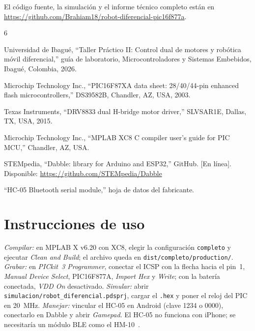 \documentclass[conference,letterpaper]{IEEEtran}
\begin{document}
El código fuente, la simulación y el informe técnico completo están en
\url{https://github.com/Brahiam18/robot-diferencial-pic16f877a}.

\begin{thebibliography}{6}

Universidad de Ibagué, ``Taller Práctico II: Control dual de motores y
robótica móvil diferencial,'' guía de laboratorio, Microcontroladores y
Sistemas Embebidos, Ibagué, Colombia, 2026.

Microchip Technology Inc., ``PIC16F87XA data sheet: 28/40/44-pin enhanced
flash microcontrollers,'' DS39582B, Chandler, AZ, USA, 2003.

Texas Instruments, ``DRV8833 dual H-bridge motor driver,'' SLVSAR1E, Dallas,
TX, USA, 2015.

Microchip Technology Inc., ``MPLAB XC8 C compiler user's guide for PIC MCU,''
Chandler, AZ, USA.

STEMpedia, ``Dabble: library for Arduino and ESP32,'' GitHub. [En línea].
Disponible: \url{https://github.com/STEMpedia/Dabble}

``HC-05 Bluetooth serial module,'' hoja de datos del fabricante.

\end{thebibliography}

\appendices
\section{Instrucciones de uso}

\textit{Compilar:} en MPLAB X v6.20 con XC8, elegir la configuración
\texttt{completo} y ejecutar \emph{Clean and Build}; el archivo queda en
\texttt{dist/completo/production/}.
\textit{Grabar:} en \emph{PICkit~3 Programmer}, conectar el ICSP con la flecha
hacia el pin~1, \emph{Manual Device Select}, PIC16F877A, \emph{Import Hex} y
\emph{Write}; con la batería conectada, \emph{VDD On} desactivado.
\textit{Simular:} abrir \texttt{simulacion/robot\_diferencial.pdsprj},
cargar el \texttt{.hex} y poner el reloj del PIC en \SI{20}{\mega\hertz}.
\textit{Manejar:} vincular el HC-05 en Android (clave 1234 o 0000), conectarlo
en Dabble y abrir \emph{Gamepad}. El HC-05 no funciona con iPhone; se
necesitaría un módulo BLE como el HM-10~\cite{hc05}.
\end{document}
